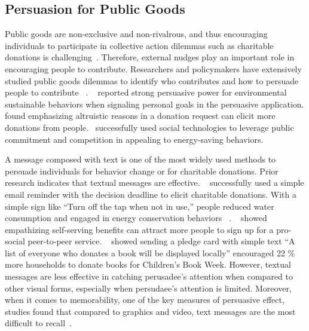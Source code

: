 \subsection{Persuasion for Public Goods}
Public goods are non-exclusive and non-rivalrous, and thus encouraging individuals to participate in collective action dilemmas such as charitable donations is challenging~\cite{marwell1981economists,isaac1982public}. Therefore, external nudges play an important role in encouraging people to contribute. Researchers and policymakers have extensively studied public goods dilemmas to identify who contributes and how to persuade people to contribute ~\cite{olson2009logic,becker1974theory,andreoni1990impure,miguel2005ethnic,burnett1981psychographic,pessemier1977willingness,burnett1981psychographic}.  ~\textcite{midden2008using} reported strong persuasive power for environmental sustainable behaviors when signaling personal goals in the persuasive application. \textcite{feiler2012mixed} found emphasizing altruistic reasons in a donation request can elicit more donations from people.~\textcite{mankoff2010stepgreen} successfully used social technologies to leverage public commitment and competition in appealing to energy-saving behaviors. 

A message composed with text is one of the most widely used methods to persuade individuals for behavior change or for charitable donations. Prior research indicates that textual messages are effective. ~\textcite{damgaard2017now} successfully used a simple email reminder with the decision deadline to elicit charitable donations. With a simple sign like ``Turn off the tap when not in use,'' people reduced water consumption and engaged in energy conservation behaviors ~\cite{mckenzie2011fostering}. ~\textcite{vaish2018s} showed empathizing self-serving benefits can attract more people to sign up for a pro-social peer-to-peer service.  ~\textcite{cotterill2010impact} showed sending a pledge card with simple text ``A list of everyone who donates a book will be displayed locally'' encouraged 22 \% more households to donate books for Children's Book Week. However, textual messages are less effective in catching perusadee's attention when compared to other visual forms, especially when persudaee's attention is limited. Moreover, when it comes to memorability, one of the key measures of persuasive effect, studies found that compared to graphics and video, text messages are the most difficult to recall~\cite{houts2006role,schmitt1993memory,messaris1997visual}. 

